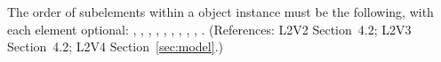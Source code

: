 The order of subelements within a \Model object instance must be the
following, with each element optional:
, ,
, ,
,
,
, , ,
.  (References: L2V2 Section~4.2; L2V3
Section~4.2; L2V4 Section~\ref{sec:model}.)
